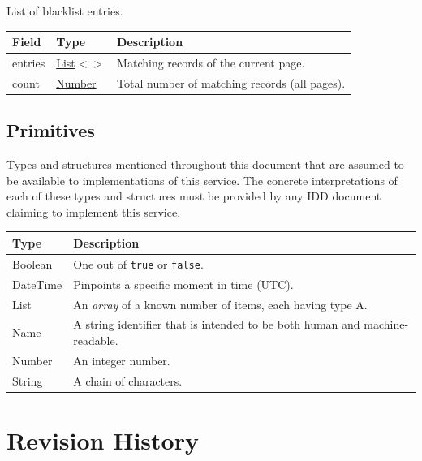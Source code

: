 \documentclass[a4paper]{arrowhead}
\newcommand{\mref}[2][]{{\textcolor{ArrowheadPurple}{\hyperref[sec:model:#2]{\ifstrempty{#1}{#2}{#1}}}}}
\newcommand{\pdef}[1]{{\textcolor{ArrowheadGrey}{#1\label{sec:model:primitives:#1}\label{sec:model:primitives:#1s}\label{sec:model:primitives:#1es}}}}
\newcommand{\pref}[1]{{\textcolor{ArrowheadGrey}{\hyperref[sec:model:primitives:#1]{#1}}}}
\begin{document}

List of blacklist entries.


\noindent\begin{tabularx}{\textwidth}{| >{\raggedright\arraybackslash}p{3.9cm} | >{\raggedright\arraybackslash\small}p{5.3cm} | X |} \hline
\rowcolor{gray!33} Field & Type & Description \\ \hline
entries & \pref{List}$<$\allowbreak{}\mref{BlacklistEntry}$>$ & Matching records of the current page. \\ \hline
count & \pref{Number} & Total number of matching records (all pages). \\ \hline
\end{tabularx}



\subsection{Primitives}
\label{sec:model:primitives}

Types and structures mentioned throughout this document that are assumed to be available to implementations of this service.
The concrete interpretations of each of these types and structures must be provided by any IDD document claiming to implement this service.

\noindent\begin{tabularx}{\textwidth}{| p{4.6cm} | X |} \hline
\rowcolor{gray!33} Type & Description \\ \hline
\pdef{Boolean} & One out of \texttt{true} or \texttt{false}. \\ \hline
\pdef{DateTime} & Pinpoints a specific moment in time (UTC). \\ \hline
\pdef{List} & An \textit{array} of a known number of items, each having type A. \\ \hline
\pdef{Name} & A string identifier that is intended to be both human and machine-readable. \\ \hline
\pdef{Number} & An integer number. \\ \hline
\pdef{String} & A chain of characters. \\ \hline
\end{tabularx}

\newpage




\newpage

\section{Revision History}
\end{document}

